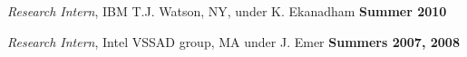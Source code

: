 \documentclass[margin,line]{resume}
\begin{document}
\begin{resume}
    \vspace{-5mm}
    
    \textit{Research Intern}, IBM T.J. Watson, NY, under K. Ekanadham \hfill \textbf{Summer 2010}\\ 

    \vspace{-5mm}

    \textit{Research Intern}, Intel VSSAD group, MA under J. Emer \hfill \textbf{Summers 2007, 2008}\\
    \vspace{-5mm}

\end{resume}
\end{document}
